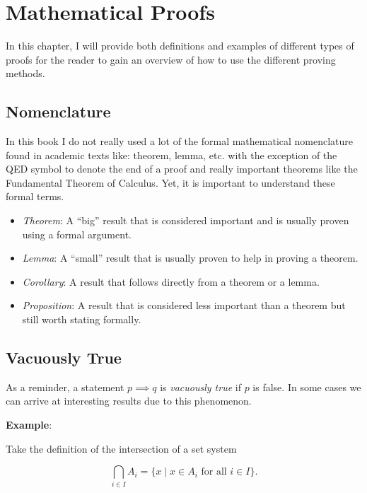 \chapter{Mathematical Proofs}

In this chapter, I will provide both definitions and examples of different types of proofs for the reader to
gain an overview of how to use the different proving methods.

\section{Nomenclature}

In this book I do not really used a lot of the formal mathematical nomenclature found in academic texts like: theorem, lemma, etc. with the
exception of the QED symbol to denote the end of a proof and really important theorems like the Fundamental Theorem of Calculus. Yet,
it is important to understand these formal terms.

\begin{itemize}

	\item \emph{Theorem}: A ``big'' result that is considered important and is usually proven using a formal argument.

	\item \emph{Lemma}: A ``small'' result that is usually proven to help in proving a theorem.

	\item \emph{Corollary}: A result that follows directly from a theorem or a lemma.

	\item \emph{Proposition}: A result that is considered less important than a theorem but still worth stating formally.

\end{itemize}

\section{Vacuously True}

As a reminder, a statement \(p \implies q\) is \emph{vacuously true} if \(p\) is false. In some cases we can arrive at interesting results due
to this phenomenon.

\textbf{Example}:

Take the definition of the intersection of a set system

\[
	\bigcap_{i \in I} A_i = \{ x \mid x \in A_i \text{ for all } i \in I \}.
\]

